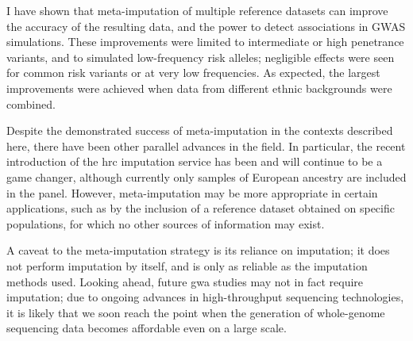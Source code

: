 I have shown that meta-imputation of multiple reference datasets can improve the accuracy of the resulting data, and the power to detect associations in GWAS simulations.
These improvements were limited to intermediate or high penetrance variants, and to simulated low-frequency risk alleles; negligible effects were seen for common risk variants or at very low frequencies.
As expected, the largest improvements were achieved when data from different ethnic backgrounds were combined.

Despite the demonstrated success of meta-imputation in the contexts described here, there have been other parallel advances in the field.
In particular, the recent introduction of the \gls{hrc} imputation service has been and will continue to be a game changer, although currently only samples of European ancestry are included in the panel.
However, meta-imputation may be more appropriate in certain applications, such as by the inclusion of a reference dataset obtained on specific populations, for which no other sources of information may exist.

A caveat to the meta-imputation strategy is its reliance on imputation; it does not perform imputation by itself, and is only as reliable as the imputation methods used.
Looking ahead, future \gls{gwa} studies may not in fact require imputation; due to ongoing advances in high-throughput sequencing technologies, it is likely that we soon reach the point when the generation of whole-genome sequencing data becomes affordable even on a large scale.



